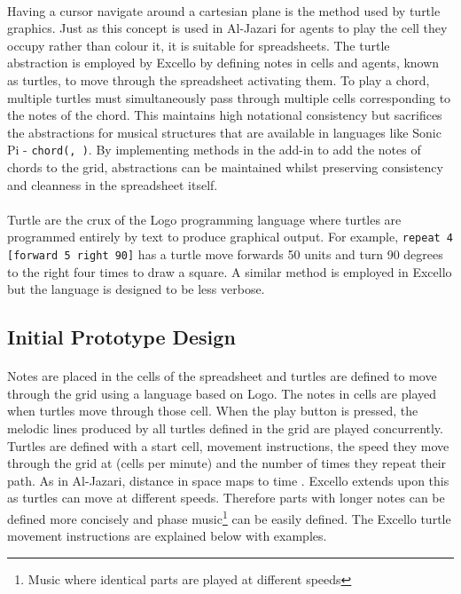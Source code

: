 \paragraph{} Having a cursor navigate around a cartesian plane is the method used by turtle graphics. Just as this concept is used in Al-Jazari for agents to play the cell they occupy rather than colour it, it is suitable for spreadsheets. The turtle abstraction is employed by Excello by defining notes in cells and agents, known as turtles, to move through the spreadsheet activating them. To play a chord, multiple turtles must simultaneously pass through multiple cells corresponding to the notes of the chord. This maintains high notational consistency but sacrifices the abstractions for musical structures that are available in languages like Sonic Pi - \texttt{chord(, )}. By implementing methods in the add-in to add the notes of chords to the grid, abstractions can be maintained whilst preserving consistency and cleanness in the spreadsheet itself.

\paragraph{} Turtle are the crux of the Logo programming language \cite{goldman:turtle} where turtles are programmed entirely by text to produce graphical output. For example, \texttt{repeat 4 [forward 5 right 90]} has a turtle move forwards 50 units and turn 90 degrees to the right four times to draw a square. A similar method is employed in Excello but the language is designed to be less verbose.

\subsection{Initial Prototype Design}

\paragraph{} Notes are placed in the cells of the spreadsheet and turtles are defined to move through the grid using a language based on Logo. The notes in cells are played when turtles move through those cell. When the play button is pressed, the melodic lines produced by all turtles defined in the grid are played concurrently. Turtles are defined with a start cell, movement instructions, the speed they move through the grid at (cells per minute) and the number of times they repeat their path. As in Al-Jazari, distance in space maps to time \cite{mclean:texture}. Excello extends upon this as turtles can move at different speeds. Therefore parts with longer notes can be defined more concisely and phase music\footnote{Music where identical parts are played at different speeds} can be easily defined. The Excello turtle movement instructions are explained below with examples.

